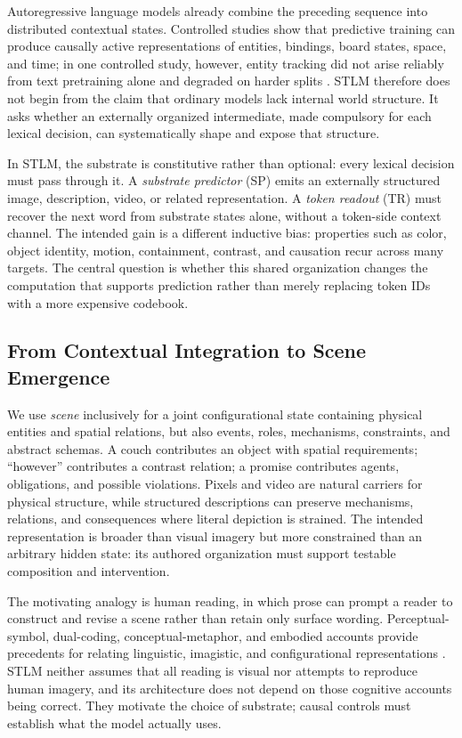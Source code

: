 \documentclass[11pt,a4paper]{article}
\begin{document}
Autoregressive language models already combine the preceding sequence into distributed contextual states. Controlled studies show that predictive training can produce causally active representations of entities, bindings, board states, space, and time; in one controlled study, however, entity tracking did not arise reliably from text pretraining alone and degraded on harder splits \cite{implicitmeaning2021,othelloworld2023,entitytracking2023,feng2024binding,gurnee2024spacetime}. STLM therefore does not begin from the claim that ordinary models lack internal world structure. It asks whether an externally organized intermediate, made compulsory for each lexical decision, can systematically shape and expose that structure.

In STLM, the substrate is constitutive rather than optional: every lexical decision must pass through it. A \emph{substrate predictor} (SP) emits an externally structured image, description, video, or related representation. A \emph{token readout} (TR) must recover the next word from substrate states alone, without a token-side context channel. The intended gain is a different inductive bias: properties such as color, object identity, motion, containment, contrast, and causation recur across many targets. The central question is whether this shared organization changes the computation that supports prediction rather than merely replacing token IDs with a more expensive codebook.

\subsection{From Contextual Integration to Scene Emergence}

We use \emph{scene} inclusively for a joint configurational state containing physical entities and spatial relations, but also events, roles, mechanisms, constraints, and abstract schemas. A couch contributes an object with spatial requirements; ``however'' contributes a contrast relation; a promise contributes agents, obligations, and possible violations. Pixels and video are natural carriers for physical structure, while structured descriptions can preserve mechanisms, relations, and consequences where literal depiction is strained. The intended representation is broader than visual imagery but more constrained than an arbitrary hidden state: its authored organization must support testable composition and intervention.

The motivating analogy is human reading, in which prose can prompt a reader to construct and revise a scene rather than retain only surface wording. Perceptual-symbol, dual-coding, conceptual-metaphor, and embodied accounts provide precedents for relating linguistic, imagistic, and configurational representations \cite{barsalou,paivio,lakoff_johnson}. STLM neither assumes that all reading is visual nor attempts to reproduce human imagery, and its architecture does not depend on those cognitive accounts being correct. They motivate the choice of substrate; causal controls must establish what the model actually uses.
\end{document}
